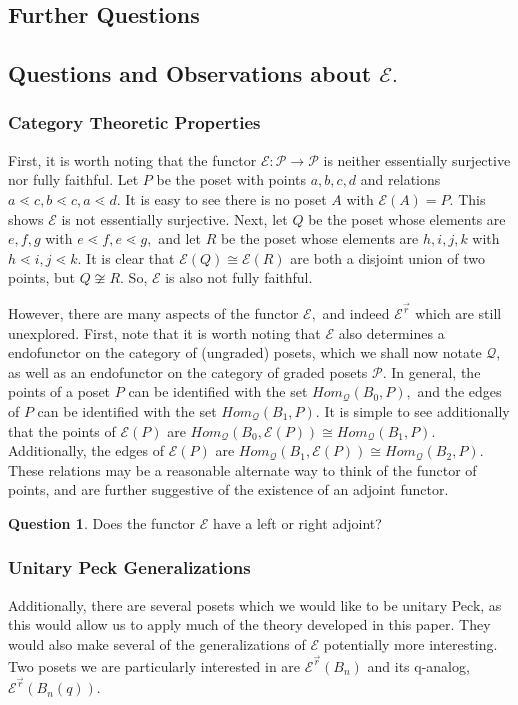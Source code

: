 \documentclass[10 pt]{amsart}
\theoremstyle{plain}
\theoremstyle{definition}
\newtheorem{question}[thm]{Question}
\theoremstyle{remark}
\numberwithin{equation}{section}
\newcommand\ssec{\subsection}
\newcommand\sssec{\subsubsection}
\renewcommand{\vec}[1]{\overrightarrow{#1}}
\begin{document}
\ssec{Further Questions}

\ssec{Questions and Observations about $\mathcal E.$}

\sssec{Category Theoretic Properties}

First, it is worth noting that the functor $\mathcal E:\mathcal P \rightarrow \mathcal P$ is neither essentially surjective nor fully faithful. Let $P$ be the poset with points $a,b,c,d$ and relations $a \lessdot c, b \lessdot c, a \lessdot d.$ It is easy to see there is no poset $A$ with $\mathcal E(A) = P.$ This shows $\mathcal E$ is not essentially surjective. Next, let $Q$ be the poset whose elements are $e,f,g$ with $e \lessdot f, e \lessdot g,$ and let $R$ be the poset whose elements are $h,i,j,k$ with $h \lessdot i, j \lessdot k.$ It is clear that $\mathcal E(Q) \cong \mathcal E(R)$ are both a disjoint union of two points, but $Q \not \cong R.$ So, $\mathcal E$ is also not fully faithful.

However, there are many aspects of the functor $\mathcal E,$ and indeed $\mathcal E^{\vec r}$ which are still unexplored. First, note that it is worth noting that $\mathcal E$ also determines a endofunctor on the category of (ungraded) posets, which we shall now notate $\mathcal Q,$ as well as an endofunctor on the category of graded posets $\mathcal P.$ In general, the points of a poset $P$ can be identified with the set $Hom_{\mathcal Q}(B_0,P),$ and the edges of $P$ can be identified with the set $Hom_{\mathcal Q}(B_1,P).$ It is simple to see additionally that the points of $\mathcal E(P)$ are $Hom_{\mathcal Q}(B_0,\mathcal E(P)) \cong Hom_{\mathcal Q}(B_1,P).$ Additionally, the edges of $\mathcal E(P)$ are $Hom_{\mathcal Q}(B_1,\mathcal E(P)) \cong Hom_{\mathcal Q}(B_2,P).$ These relations may be a reasonable alternate way to think of the functor of points, and are further suggestive of the existence of an adjoint functor.

\begin{question}
Does the functor $\mathcal E$ have a left or right adjoint?
\end{question}

\sssec{Unitary Peck Generalizations}

Additionally, there are several posets which we would like to be unitary  
Peck, as this would allow us to apply much of the theory developed in this paper. They would also make several of the generalizations of $\mathcal E$ potentially more interesting. Two posets we are particularly interested in are $\mathcal E^{\vec r}(B_n)$ and its q-analog, $\mathcal E^{\vec r}(B_n(q)).$
\end{document}
